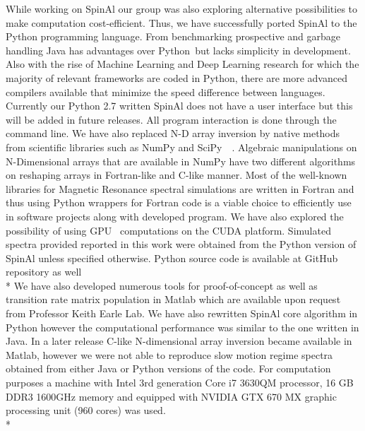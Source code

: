 While working on SpinAl our group was also exploring alternative possibilities to make computation cost-efficient. Thus, we have successfully ported SpinAl to the Python programming language. From benchmarking prospective and garbage handling Java has advantages over Python~\cite{slower}but lacks simplicity in development. Also with the rise of Machine Learning and Deep Learning research for which the majority of relevant frameworks are coded in Python, there are more advanced compilers available that minimize the speed difference between languages. Currently our Python 2.7 written SpinAl does not have a user interface but this will be added in future releases. All program interaction is done through the command line. We have also replaced N-D array inversion by native methods from scientific libraries such as NumPy and SciPy~\cite{SciPy1}~\cite{SciPy2}. Algebraic manipulations on N-Dimensional arrays that are available in NumPy have two different algorithms on reshaping arrays in Fortran-like and C-like manner. Most of the well-known libraries for Magnetic Resonance spectral simulations are written in Fortran and thus using Python wrappers for Fortran code is a viable choice to efficiently use in software projects along with developed program. We have also explored the possibility of using GPU~\cite{gpu} computations on the CUDA platform. Simulated spectra provided reported in this work were obtained from the Python version of SpinAl unless specified otherwise. Python source code is available at GitHub repository as well~\cite{eprgit}\\*
We have also developed numerous tools for proof-of-concept as well as transition rate matrix population in Matlab which are available upon request from Professor Keith Earle Lab. We have also rewritten SpinAl core algorithm in Python however the computational performance was similar to the one written in Java. In a later release C-like N-dimensional array inversion became available in Matlab, however we were not able to reproduce slow motion regime spectra obtained from either Java or Python versions of the code. For computation purposes a machine with Intel 3rd generation Core i7 3630QM processor, 16 GB DDR3 1600GHz memory and equipped with NVIDIA GTX 670 MX graphic processing unit (960 cores) was used.\\* 
